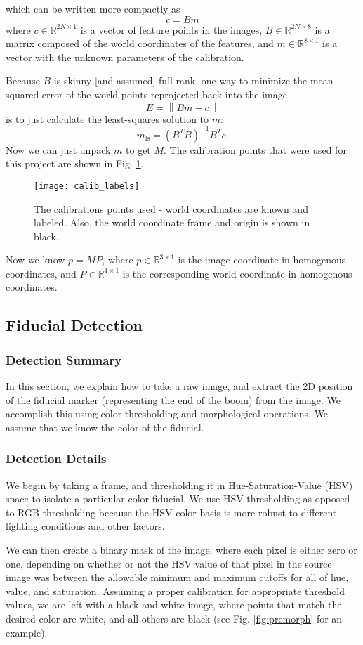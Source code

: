 \documentclass[letterpaper, 10 pt, conference]{ieeeconf}  %
\newcommand{\real}[1]{\mathbb{R}^{#1}}
\newcommand{\norm}[1]{\left\lVert #1 \right\rVert}
\begin{document}
which can be written more compactly as 
\[
c = Bm
\]
where $c \in \real{2N \times 1}$ is a vector of feature points in the images, $B \in \real{2N \times 8}$ is a matrix composed of the world coordinates of the features, and $m \in \real{8 \times 1}$ is a vector with the unknown parameters of the calibration.

Because $B$ is skinny [and assumed] full-rank, one way to minimize the mean-squared error of the world-points reprojected back into the image
\[
E = \norm{Bm - c}
\] is to just calculate the least-squares solution to $m$:
\[
m_{\text{ls}} = \left(B^TB\right)^{-1}B^Tc.
\]
Now we can just unpack $m$ to get $M$. The calibration points that were used for this project are  shown in Fig. \ref{fig:calib_labels}.
\begin{figure}[htbp]
   \centering
   \texttt{[image: calib\_labels]}
   \caption{The calibrations points used - world coordinates are known and labeled. Also, the world coordinate frame and origin is shown in black.}
   \label{fig:calib_labels}
\end{figure}

Now we know $p = MP$, where $p \in \real{3\times 1}$ is the image coordinate in homogenous coordinates, and $P \in \real{4 \times 1}$ is the corresponding world coordinate in homogenous coordinates. 
\subsection{Fiducial Detection}
\label{sec:fid}
\subsubsection{Detection Summary}
In this section, we explain how to take a raw image, and extract the 2D position of the fiducial marker (representing the end of the boom) from the image. We accomplish this using color thresholding and morphological operations. We assume that we know the color of the fiducial. 
\subsubsection{Detection Details}
We begin by taking a frame, and thresholding it in Hue-Saturation-Value (HSV) space to isolate a particular color fiducial. We use HSV thresholding as opposed to RGB thresholding because the HSV color basis is more robust to different lighting conditions and other factors. 

We can then create a binary mask of the image, where each pixel is either zero or one, depending on whether or not the HSV value of that pixel in the source image was between the allowable minimum and maximum cutoffs for all of hue, value, and saturation. 
Assuming a proper calibration for appropriate threshold values, we are left with a black and white image, where points that match the desired color are white, and all others are black (see Fig. \ref{fig:premorph} for an example). 
\end{document}
